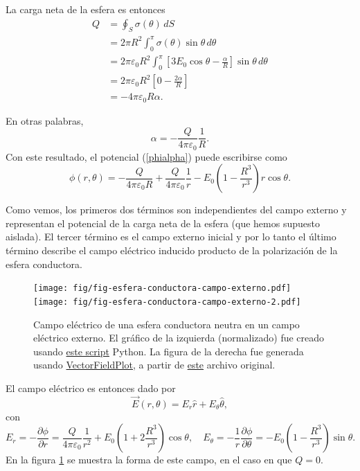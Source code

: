 La carga neta de la esfera es entonces
\begin{align}
Q &= \oint_S\sigma(\theta)\,dS \\
&= 2\pi R^2 \int_0^\pi \sigma(\theta)\sin\theta\,d\theta \\
&= 2\pi \varepsilon_0R^2 \int_0^\pi \left[3E_0\cos\theta-\frac{\alpha}{R}\right] \sin\theta\,d\theta \\
&= 2\pi \varepsilon_0R^2 \left[ 0-\frac{2\alpha}{R}\right] \\
&= -4\pi \varepsilon_0R \alpha .
\end{align}

En otras palabras, 
\begin{equation}
\alpha=-\frac{Q}{4\pi \varepsilon_0}\frac{1}{R}.
\end{equation}
Con este resultado, el potencial (\ref{phialpha}) puede escribirse como 
\begin{equation}
\phi(r,\theta)=-\frac{Q}{4\pi\varepsilon_0 R}+\frac{Q}{4\pi\varepsilon_0}\frac{1}{r} -E_0 \left(1-\frac{R^3}{r^3}\right)r\cos\theta.
\end{equation}

Como vemos, los primeros dos términos son independientes del campo externo y representan el potencial de la carga neta de la esfera (que hemos supuesto aislada). El tercer término es el campo externo inicial y por lo tanto el último término describe el campo eléctrico inducido producto de la polarización de la esfera conductora.
\begin{figure}[!h]
\centerline{\texttt{[image: fig/fig-esfera-conductora-campo-externo.pdf]}
\hspace{1cm}
\texttt{[image: fig/fig-esfera-conductora-campo-externo-2.pdf]}}
\caption{Campo eléctrico de una esfera conductora neutra en un campo eléctrico externo. El gráfico de la izquierda (normalizado) fue creado usando \href{https://github.com/gfrubi/electrodinamica/blob/master/figuras-editables/fig-esfera-conductora-campo-externo-raw.py}{este script} Python. La figura de la derecha fue generada usando \href{http://commons.wikimedia.org/wiki/User:Geek3/VectorFieldPlot}{VectorFieldPlot}, a partir de \href{http://commons.wikimedia.org/wiki/File:VFPt_superconductor_ball_E-field.svg}{este} archivo original.}
\label{fig:ecce}
\end{figure}

El campo eléctrico es entonces dado por
\begin{equation}
\vec{E}(r,\theta) = E_r\hat{r}+E_\theta\hat{\theta},
\end{equation}
con 
\begin{equation}
E_r = -\frac{\partial\phi}{\partial r} = \frac{Q}{4\pi\varepsilon_0}\frac{1}{r^2}+E_0 \left(1+2\frac{R^3}{r^3}\right)\cos\theta, \quad E_\theta = -\frac{1}{r}\frac{\partial\phi}{\partial\theta} =-E_0 \left(1-\frac{R^3}{r^3}\right)\sin\theta .
\end{equation}
En la figura \ref{fig:ecce} se muestra la forma de este campo, en el caso en que $Q=0$.


